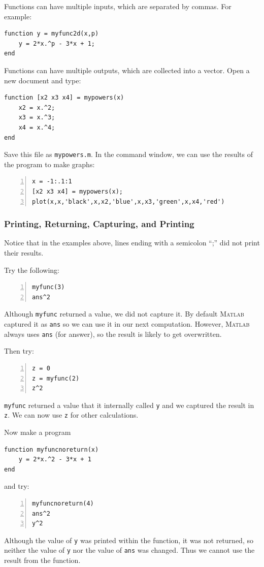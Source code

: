 Functions can have multiple inputs, which are separated by commas. 
For example:
\begin{lstlisting}
function y = myfunc2d(x,p)
    y = 2*x.^p - 3*x + 1;
end
\end{lstlisting}

Functions can have multiple outputs, which are collected into a vector. 
Open a new document and type:
\begin{lstlisting}
function [x2 x3 x4] = mypowers(x)
    x2 = x.^2;
    x3 = x.^3;
    x4 = x.^4;
end
\end{lstlisting}
Save this file as \verb&mypowers.m&.
In the command window, we can use the results of the program to make graphs:
\begin{lstlisting}[frame=none,numbers=left]
x = -1:.1:1
[x2 x3 x4] = mypowers(x);
plot(x,x,'black',x,x2,'blue',x,x3,'green',x,x4,'red')
\end{lstlisting}

\subsubsection{Printing, Returning, Capturing, and Printing}

Notice that in the examples above, lines ending with a semicolon ``;''
did not print their results.

Try the following:
\begin{lstlisting}[frame=none,numbers=left]
myfunc(3)
ans^2
\end{lstlisting}
Although \verb&myfunc& returned a value, we did not capture it. By
default \textsc{Matlab} captured it as \verb&ans& so we can use it in
our next computation. However, \textsc{Matlab} always uses \verb&ans&
(for answer), so the result is likely to get overwritten.

Then try:
\begin{lstlisting}[frame=none,numbers=left]
z = 0
z = myfunc(2)
z^2
\end{lstlisting}
\verb&myfunc&
returned a value that it internally called \verb&y& and we captured
the result in \verb&z&. We can now use \verb&z& for other calculations.

Now make a program 
\begin{lstlisting}
function myfuncnoreturn(x)
    y = 2*x.^2 - 3*x + 1
end
\end{lstlisting}
and try:
\begin{lstlisting}[frame=none,numbers=left]
myfuncnoreturn(4)
ans^2
y^2
\end{lstlisting}
Although the value of \verb&y& was printed within the function, it was
not returned, so neither the value of \verb&y& nor the value of
\verb&ans& was changed. Thus we cannot use the result from the function.

